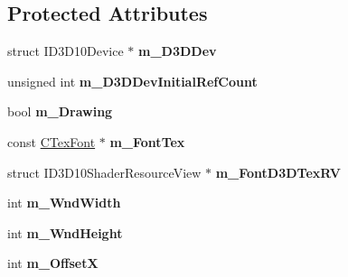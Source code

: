 \subsection*{Protected Attributes}
\begin{DoxyCompactItemize}
\item 
\hypertarget{class_c_tw_graph_direct3_d10_a57d94580b611041853c6d313006ab5fd}{struct I\+D3\+D10\+Device $\ast$ {\bfseries m\+\_\+\+D3\+D\+Dev}}\label{class_c_tw_graph_direct3_d10_a57d94580b611041853c6d313006ab5fd}

\item 
\hypertarget{class_c_tw_graph_direct3_d10_a64257468d91caf1eb435930180e6629e}{unsigned int {\bfseries m\+\_\+\+D3\+D\+Dev\+Initial\+Ref\+Count}}\label{class_c_tw_graph_direct3_d10_a64257468d91caf1eb435930180e6629e}

\item 
\hypertarget{class_c_tw_graph_direct3_d10_a5ea1c904ac3fb856eab4181b33c430f5}{bool {\bfseries m\+\_\+\+Drawing}}\label{class_c_tw_graph_direct3_d10_a5ea1c904ac3fb856eab4181b33c430f5}

\item 
\hypertarget{class_c_tw_graph_direct3_d10_afd4b2f4c84b4f92ff9bbd01bbd8291d5}{const \hyperlink{struct_c_tex_font}{C\+Tex\+Font} $\ast$ {\bfseries m\+\_\+\+Font\+Tex}}\label{class_c_tw_graph_direct3_d10_afd4b2f4c84b4f92ff9bbd01bbd8291d5}

\item 
\hypertarget{class_c_tw_graph_direct3_d10_a65ac873a39dd06deeba6f6992dd46843}{struct I\+D3\+D10\+Shader\+Resource\+View $\ast$ {\bfseries m\+\_\+\+Font\+D3\+D\+Tex\+R\+V}}\label{class_c_tw_graph_direct3_d10_a65ac873a39dd06deeba6f6992dd46843}

\item 
\hypertarget{class_c_tw_graph_direct3_d10_ad661c53b3d32a4aec89108e7a01d8908}{int {\bfseries m\+\_\+\+Wnd\+Width}}\label{class_c_tw_graph_direct3_d10_ad661c53b3d32a4aec89108e7a01d8908}

\item 
\hypertarget{class_c_tw_graph_direct3_d10_ace82e80726866e8b29d1ee968d15178b}{int {\bfseries m\+\_\+\+Wnd\+Height}}\label{class_c_tw_graph_direct3_d10_ace82e80726866e8b29d1ee968d15178b}

\item 
\hypertarget{class_c_tw_graph_direct3_d10_a0de3d44745bd2a0099ea362c62668aba}{int {\bfseries m\+\_\+\+Offset\+X}}\label{class_c_tw_graph_direct3_d10_a0de3d44745bd2a0099ea362c62668aba}


\end{DoxyCompactItemize}
